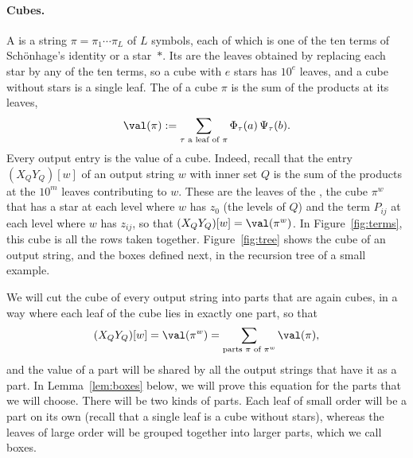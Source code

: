 \paragraph{Cubes.}
A  is a string $\pi=\pi_1\cdots\pi_L$ of $L$ symbols, each of which is one of the ten terms of Sch\"onhage's identity or a star~$\ast$. Its  are the leaves obtained by replacing each star by any of the ten terms, so a cube with $e$ stars has $10^e$ leaves, and a cube without stars is a single leaf. The  of a cube $\pi$ is the sum of the products at its leaves,
\[
\val(\pi):=\sum_{\tau\text{ a leaf of }\pi}\Phi_\tau(a)\,\Psi_\tau(b).
\]
Every output entry is the value of a cube. Indeed, recall that the entry $(X_QY_Q)[w]$ of an output string $w$ with inner set $Q$ is the sum of the products at the $10^m$ leaves contributing to $w$. These are the leaves of the , the cube $\pi^w$ that has a star at each level where $w$ has $z_0$ (the levels of $Q$) and the term $P_{ij}$ at each level where $w$ has $z_{ij}$, so that $(X_QY_Q)[w]=\val(\pi^w)$. In Figure~\ref{fig:terms}, this cube is all the rows taken together. Figure~\ref{fig:tree} shows the cube of an output string, and the boxes defined next, in the recursion tree of a small example.

We will cut the cube of every output string into parts that are again cubes, in a way where each leaf of the cube lies in exactly one part, so that
\[
(X_QY_Q)[w]=\val(\pi^w)=\sum_{\text{parts }\pi\text{ of }\pi^w}\val(\pi),
\]
and the value of a part will be shared by all the output strings that have it as a part. In Lemma~\ref{lem:boxes} below, we will prove this equation for the parts that we will choose. There will be two kinds of parts. Each leaf of small order will be a part on its own (recall that a single leaf is a cube without stars), whereas the leaves of large order will be grouped together into larger parts, which we call boxes.

